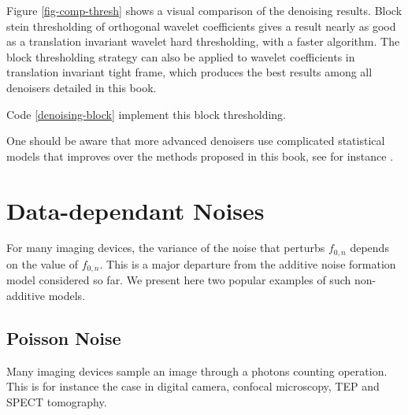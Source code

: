 Figure \ref{fig-comp-thresh} shows a visual comparison of the denoising results. Block stein thresholding of orthogonal wavelet coefficients gives a result nearly as good as a translation invariant wavelet hard thresholding, with a faster algorithm. 
The block thresholding strategy can also be applied to wavelet coefficients in translation invariant tight frame, which produces the best results among all denoisers detailed in this book. 

Code \ref{denoising-block} implement this block thresholding.


One should be aware that more advanced denoisers use complicated statistical models that improves over the methods proposed in this book, see for instance \cite{portilla-denoise}.




\section{Data-dependant Noises}
\label{sect-data-dept-noises}

For many imaging devices, the variance of the noise that perturbs $f_{0,n}$ depends on the value of $f_{0,n}$. This is a major departure from the additive noise formation model considered so far. We present here two popular examples of such non-additive models.

\subsection{Poisson Noise}

Many imaging devices sample an image through a photons counting operation. This is for instance the case in digital camera, confocal microscopy, TEP and SPECT tomography.

